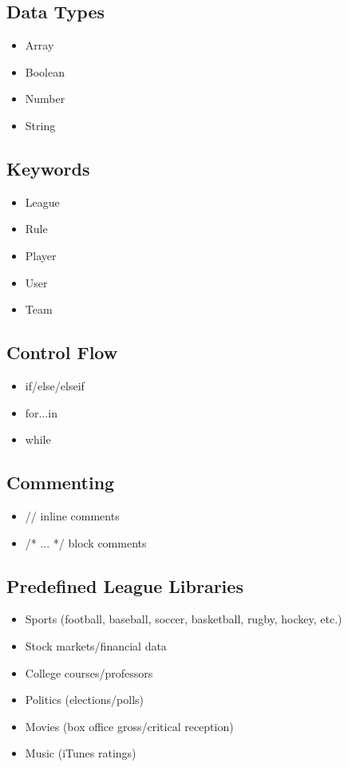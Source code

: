\documentclass[12pt]{article}
\begin{document}
\subsection{Data Types}

\begin{itemize}
\item Array
\item Boolean
\item Number
\item String
\end{itemize}

\subsection{Keywords}

\begin{itemize}
\item League
\item Rule
\item Player
\item User
\item Team
\end{itemize}

\subsection{Control Flow}

\begin{itemize}
\item if/else/elseif
\item for...in
\item while
\end{itemize}

\subsection{Commenting}

\begin{itemize}
\item // inline comments
\item /* ... */ block comments
\end{itemize}

\subsection{Predefined League Libraries}

\begin{itemize}
\item Sports (football, baseball, soccer, basketball, rugby, hockey, etc.)
\item Stock markets/financial data
\item College courses/professors
\item Politics (elections/polls)
\item Movies (box office gross/critical reception)
\item Music (iTunes ratings)
\end{itemize}
\end{document}
